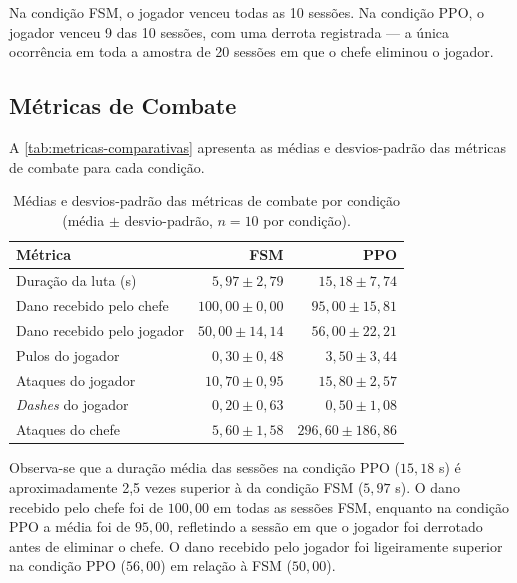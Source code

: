 Na condição FSM, o jogador venceu todas as 10 sessões. Na condição PPO, o
jogador venceu 9 das 10 sessões, com uma derrota registrada --- a única
ocorrência em toda a amostra de 20 sessões em que o chefe eliminou o jogador.

\subsection{Métricas de Combate}
\label{subsec:metricas-combate}

A \autoref{tab:metricas-comparativas} apresenta as médias e desvios-padrão
das métricas de combate para cada condição.

\begin{table}[htb]
    \centering
    \caption{Médias e desvios-padrão das métricas de combate por condição
             (média $\pm$ desvio-padrão, $n = 10$ por condição).}
    \label{tab:metricas-comparativas}
    \begin{tabular}{l r r}
        \toprule
        \textbf{Métrica}
            & \textbf{FSM}
            & \textbf{PPO} \\
        \midrule
        Duração da luta (s)
            & $5{,}97 \pm 2{,}79$
            & $15{,}18 \pm 7{,}74$ \\
        \addlinespace
        Dano recebido pelo chefe
            & $100{,}00 \pm 0{,}00$
            & $95{,}00 \pm 15{,}81$ \\
        \addlinespace
        Dano recebido pelo jogador
            & $50{,}00 \pm 14{,}14$
            & $56{,}00 \pm 22{,}21$ \\
        \addlinespace
        Pulos do jogador
            & $0{,}30 \pm 0{,}48$
            & $3{,}50 \pm 3{,}44$ \\
        \addlinespace
        Ataques do jogador
            & $10{,}70 \pm 0{,}95$
            & $15{,}80 \pm 2{,}57$ \\
        \addlinespace
        \textit{Dashes} do jogador
            & $0{,}20 \pm 0{,}63$
            & $0{,}50 \pm 1{,}08$ \\
        \addlinespace
        Ataques do chefe
            & $5{,}60 \pm 1{,}58$
            & $296{,}60 \pm 186{,}86$ \\
        \bottomrule
    \end{tabular}
\end{table}

Observa-se que a duração média das sessões na condição PPO ($15{,}18$ s) é
aproximadamente 2,5 vezes superior à da condição FSM ($5{,}97$ s). O dano
recebido pelo chefe foi de $100{,}00$ em todas as sessões FSM, enquanto na
condição PPO a média foi de $95{,}00$, refletindo a sessão em que o jogador
foi derrotado antes de eliminar o chefe. O dano recebido pelo jogador foi
ligeiramente superior na condição PPO ($56{,}00$) em relação à FSM
($50{,}00$).

